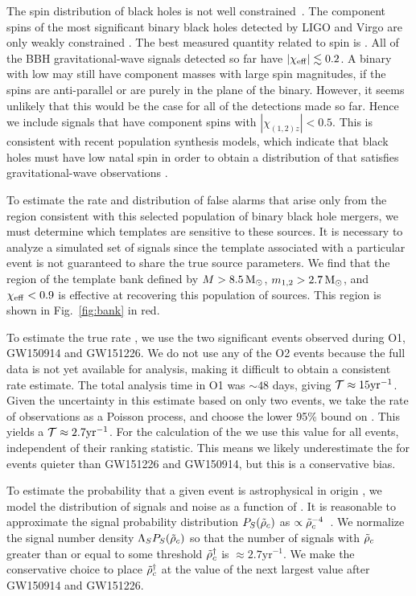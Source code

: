 The spin distribution of black holes is not well constrained~\citep{Reynolds:2013qqa}. The component spins
of the most significant binary black holes detected by LIGO and Virgo are
only weakly constrained \citep{TheLIGOScientific:2016pea}. The best measured
quantity related to spin is \chieff{}. All of the BBH gravitational-wave signals
detected so far have $|\chi_{\mathrm{eff}}| \lesssim 0.2$. A binary with
low \chieff{} may still have component masses with large spin magnitudes,
if the spins are anti-parallel or are purely in the plane of the binary.
However, it seems unlikely that this would be the case for all of the
detections made so far. Hence we include signals that have
component spins with $|\chi_{(1,2)z}| < 0.5$. This is consistent with
recent population synthesis models, which indicate that black holes
must have low natal spin in order to obtain a distribution of \chieff{}
that satisfies gravitational-wave observations \citep{Belczynski:2017gds,Wysocki:2017isg}.

To estimate the rate and distribution of false alarms that arise only
from the region consistent with this selected population of
binary black hole mergers, we must determine which templates are sensitive to these sources.
It is necessary to analyze a simulated set of signals since
the template associated with a particular event is not guaranteed to share the 
true source parameters. We find that the region of the template bank defined by
$M > 8.5\,\mathrm{M}_{\odot}$, $m_{1,2} > 2.7\,\mathrm{M}_{\odot}$, and $\chi_{\mathrm{eff}} < 0.9$ is effective at recovering
this population of sources. This region is shown in Fig.~\ref{fig:bank} in red. 

To estimate the true rate \tar{}, we use the two significant events observed
during O1, GW150914 and GW151226. We do not use any of the O2 events because the full data is
not yet available for analysis, making it difficult to obtain a consistent rate estimate. The total analysis time in O1 was $\sim48$ days, giving $\mathcal{T} \approx 15 \mathrm{yr}^{-1}$. Given the uncertainty in
this estimate based on only two events, we take the rate of observations as a Poisson process, and choose the lower
95\% bound on \tar{}. This yields a $\mathcal{T} \approx 2.7 \mathrm{yr}^{-1}$. For the calculation
of the \tdr{} we use this value for all events, independent of their ranking statistic. This means we likely underestimate the \tdr{} for events quieter than GW151226 and GW150914, but this is a conservative bias.

To estimate the probability that a given event is astrophysical in origin \pastro{}, we model
the distribution of signals and noise as a function of \rankingstat. It is reasonable to approximate the signal
probability distribution $P_S(\tilde{\rho}_c)$ as $\propto \tilde{\rho}_c^{-4}$~\citep{Schutz:2011tw,Chen:2014yla}.
We normalize the signal number density $\Lambda_S P_S(\tilde{\rho}_c)$ so that the number of signals
with $\tilde{\rho}_c$ greater than or equal to some threshold
$\tilde{\rho}_c^{\dagger}$ is $\approx 2.7 \mathrm{yr}^{-1}$. We make the conservative choice to place
$\tilde{\rho}_c^{\dagger}$ at the value of the next largest \rankingstat{} value after GW150914 and GW151226. 

